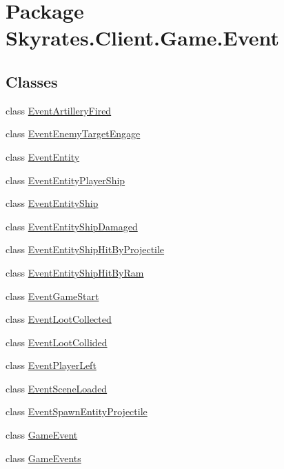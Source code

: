 \hypertarget{namespace_skyrates_1_1_client_1_1_game_1_1_event}{\section{Package Skyrates.\-Client.\-Game.\-Event}
\label{namespace_skyrates_1_1_client_1_1_game_1_1_event}
}
\subsection*{Classes}
\begin{DoxyCompactItemize}
\item 
class \hyperlink{class_skyrates_1_1_client_1_1_game_1_1_event_1_1_event_artillery_fired}{Event\-Artillery\-Fired}
\item 
class \hyperlink{class_skyrates_1_1_client_1_1_game_1_1_event_1_1_event_enemy_target_engage}{Event\-Enemy\-Target\-Engage}
\item 
class \hyperlink{class_skyrates_1_1_client_1_1_game_1_1_event_1_1_event_entity}{Event\-Entity}
\item 
class \hyperlink{class_skyrates_1_1_client_1_1_game_1_1_event_1_1_event_entity_player_ship}{Event\-Entity\-Player\-Ship}
\item 
class \hyperlink{class_skyrates_1_1_client_1_1_game_1_1_event_1_1_event_entity_ship}{Event\-Entity\-Ship}
\item 
class \hyperlink{class_skyrates_1_1_client_1_1_game_1_1_event_1_1_event_entity_ship_damaged}{Event\-Entity\-Ship\-Damaged}
\item 
class \hyperlink{class_skyrates_1_1_client_1_1_game_1_1_event_1_1_event_entity_ship_hit_by_projectile}{Event\-Entity\-Ship\-Hit\-By\-Projectile}
\item 
class \hyperlink{class_skyrates_1_1_client_1_1_game_1_1_event_1_1_event_entity_ship_hit_by_ram}{Event\-Entity\-Ship\-Hit\-By\-Ram}
\item 
class \hyperlink{class_skyrates_1_1_client_1_1_game_1_1_event_1_1_event_game_start}{Event\-Game\-Start}
\item 
class \hyperlink{class_skyrates_1_1_client_1_1_game_1_1_event_1_1_event_loot_collected}{Event\-Loot\-Collected}
\item 
class \hyperlink{class_skyrates_1_1_client_1_1_game_1_1_event_1_1_event_loot_collided}{Event\-Loot\-Collided}
\item 
class \hyperlink{class_skyrates_1_1_client_1_1_game_1_1_event_1_1_event_player_left}{Event\-Player\-Left}
\item 
class \hyperlink{class_skyrates_1_1_client_1_1_game_1_1_event_1_1_event_scene_loaded}{Event\-Scene\-Loaded}
\item 
class \hyperlink{class_skyrates_1_1_client_1_1_game_1_1_event_1_1_event_spawn_entity_projectile}{Event\-Spawn\-Entity\-Projectile}
\item 
class \hyperlink{class_skyrates_1_1_client_1_1_game_1_1_event_1_1_game_event}{Game\-Event}
\item 
class \hyperlink{class_skyrates_1_1_client_1_1_game_1_1_event_1_1_game_events}{Game\-Events}
\end{DoxyCompactItemize}
